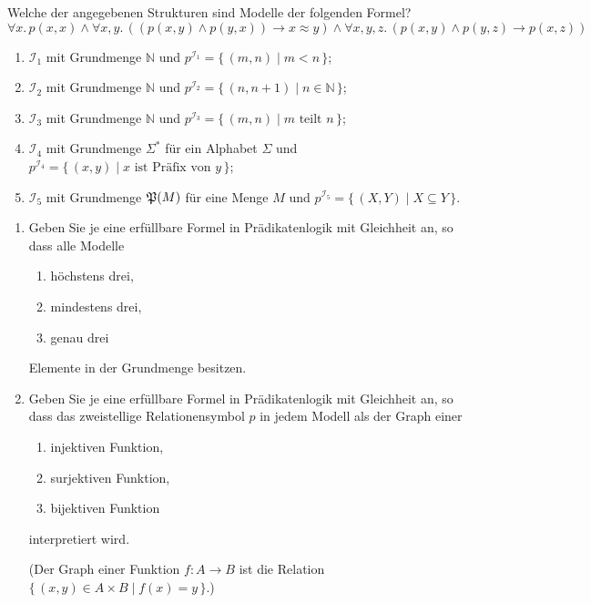 \documentclass[german]{latteachCD}[2017/03/28]
\begin{document}
\setcounter{exercise}{0}

\enlargethispage{2\baselineskip}

\begin{exercise}
  Welche der angegebenen Strukturen sind Modelle der folgenden Formel?
  \begin{equation*}
    \forall x.\, p(x,x) \land \forall x, y.\, ((p(x,y) \land
      p(y,x)) \to x \approx y)
    \land \forall x, y, z.\, (p(x,y) \land p(y,z) \to p(x,z))
  \end{equation*}
  \begin{enumerate}
  \item $\mathcal{I}_{1}$ mit Grundmenge $\mathbb N$ und $p^{\mathcal{I}_{1}} =
    \{\,(m,n) \mid m < n \,\}$;
  \item $\mathcal{I}_{2}$ mit Grundmenge $\mathbb N$ und $p^{\mathcal{I}_{2}} =
    \{\,(n,n+1) \mid n \in \mathbb N \,\}$;
  \item $\mathcal{I}_{3}$ mit Grundmenge $\mathbb N$ und $p^{\mathcal{I}_{3}} =
    \{\,(m,n) \mid m \text{ teilt } n\,\}$;
  \item $\mathcal{I}_{4}$ mit Grundmenge $\Sigma^{*}$ für ein Alphabet $\Sigma$
    und $p^{\mathcal{I}_{4}} = \{\,(x,y) \mid x \text{ ist Präfix von } y\,\}$;
  \item $\mathcal{I}_{5}$ mit Grundmenge $\mathfrak{P}(M)$ für eine Menge $M$ und
    $p^{\mathcal{I}_{5}} = \{\,(X,Y) \mid X \subseteq Y\,\}$.
  \end{enumerate}
\end{exercise}

\begin{exercise}
  \begin{enumerate}
  \item Geben Sie je eine erfüllbare Formel in Prädikatenlogik mit Gleichheit
    an, so dass alle Modelle
    \begin{enumerate}
    \item höchstens drei,
    \item mindestens drei,
    \item genau drei
    \end{enumerate}
    Elemente in der Grundmenge besitzen.
  \item Geben Sie je eine erfüllbare Formel in Prädikatenlogik mit Gleichheit
    an, so dass das zweistellige Relationensymbol $p$ in jedem Modell als der
    Graph einer
    \begin{enumerate}
    \item injektiven Funktion,
    \item surjektiven Funktion,
    \item bijektiven Funktion
    \end{enumerate}
    interpretiert wird.

    (Der Graph einer Funktion $f \colon A \to B$ ist die Relation $\{\,(x,y) \in
    A \times B \mid f(x) = y\,\}$.)
  \end{enumerate}
\end{exercise}
\end{document}

